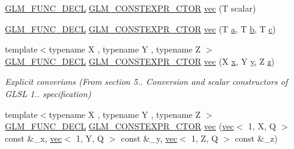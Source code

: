 \begin{DoxyCompactItemize}
\item 
\hyperlink{setup_8hpp_ab2d052de21a70539923e9bcbf6e83a51}{G\+L\+M\+\_\+\+F\+U\+N\+C\+\_\+\+D\+E\+CL} \hyperlink{setup_8hpp_ad34178a09666081abdb573c14d1f4a5a}{G\+L\+M\+\_\+\+C\+O\+N\+S\+T\+E\+X\+P\+R\+\_\+\+C\+T\+OR} \hyperlink{structglm_1_1vec_3_013_00_01_t_00_01_q_01_4_a3969041c27af93819cfcc2ca0a410277}{vec} (T scalar)
\item 
\hyperlink{setup_8hpp_ab2d052de21a70539923e9bcbf6e83a51}{G\+L\+M\+\_\+\+F\+U\+N\+C\+\_\+\+D\+E\+CL} \hyperlink{setup_8hpp_ad34178a09666081abdb573c14d1f4a5a}{G\+L\+M\+\_\+\+C\+O\+N\+S\+T\+E\+X\+P\+R\+\_\+\+C\+T\+OR} \hyperlink{structglm_1_1vec_3_013_00_01_t_00_01_q_01_4_ac155207ddc7d4472ce12d1f874cb0bcc}{vec} (T \hyperlink{_s_d_l__opengl__glext_8h_a3309789fc188587d666cda5ece79cf82}{a}, T \hyperlink{_s_d_l__opengl__glext_8h_a0f71581a41fd2264c8944126dabbd010}{b}, T \hyperlink{_s_d_l__opengl__glext_8h_a1f2d7f8147412c43ba2303a56f97ee73}{c})
\item 
{\footnotesize template$<$typename X , typename Y , typename Z $>$ }\\\hyperlink{setup_8hpp_ab2d052de21a70539923e9bcbf6e83a51}{G\+L\+M\+\_\+\+F\+U\+N\+C\+\_\+\+D\+E\+CL} \hyperlink{setup_8hpp_ad34178a09666081abdb573c14d1f4a5a}{G\+L\+M\+\_\+\+C\+O\+N\+S\+T\+E\+X\+P\+R\+\_\+\+C\+T\+OR} \hyperlink{structglm_1_1vec_3_013_00_01_t_00_01_q_01_4_a9d9e0c35f6991046e1f8f68088dc0f9a}{vec} (X \hyperlink{_s_d_l__opengl_8h_ad0e63d0edcdbd3d79554076bf309fd47}{x}, Y \hyperlink{_s_d_l__opengl_8h_a1675d9d7bb68e1657ff028643b4037e3}{y}, Z \hyperlink{_s_d_l__opengl__glext_8h_a5e74030ebb3297ce1b37ff716fedd68f}{z})
\begin{DoxyCompactList}\small\item\em Explicit converions (From section 5.. Conversion and scalar constructors of G\+L\+SL 1.. specification) \end{DoxyCompactList}\item 
{\footnotesize template$<$typename X , typename Y , typename Z $>$ }\\\hyperlink{setup_8hpp_ab2d052de21a70539923e9bcbf6e83a51}{G\+L\+M\+\_\+\+F\+U\+N\+C\+\_\+\+D\+E\+CL} \hyperlink{setup_8hpp_ad34178a09666081abdb573c14d1f4a5a}{G\+L\+M\+\_\+\+C\+O\+N\+S\+T\+E\+X\+P\+R\+\_\+\+C\+T\+OR} \hyperlink{structglm_1_1vec_3_013_00_01_t_00_01_q_01_4_a9aa0a92a8278c84bf0fd3090cbc414d6}{vec} (\hyperlink{structglm_1_1vec}{vec}$<$ 1, X, Q $>$ const \&\+\_\+x, \hyperlink{structglm_1_1vec}{vec}$<$ 1, Y, Q $>$ const \&\+\_\+y, \hyperlink{structglm_1_1vec}{vec}$<$ 1, Z, Q $>$ const \&\+\_\+z)

\end{DoxyCompactItemize}
